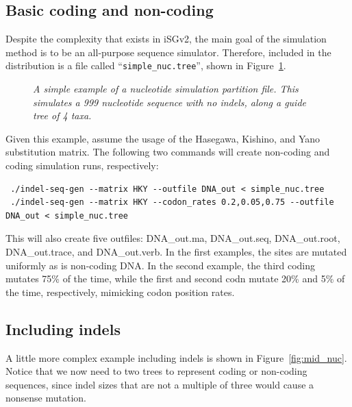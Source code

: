\documentclass[10pt]{article}
\begin{document}
 \subsection{Basic coding and non-coding}
 Despite the complexity that exists in iSGv2, the main goal of the simulation method is to be an all-purpose sequence simulator. Therefore, included in the distribution is a file called ``{\tt simple\_nuc.tree}'', shown in Figure~\ref{fig:simple_nuc}.

 \begin{figure}
 \caption{\textit{A simple example of a nucleotide simulation partition file. This simulates a 999 nucleotide sequence with no indels, along a guide tree of 4 taxa.}}
 \label{fig:simple_nuc}
 \end{figure}

 Given this example, assume the usage of the Hasegawa, Kishino, and Yano~\cite{Hasegawa85} substitution matrix. The following two commands will create non-coding and coding simulation runs, respectively:
 \begin{verbatim}
 ./indel-seq-gen --matrix HKY --outfile DNA_out < simple_nuc.tree
 ./indel-seq-gen --matrix HKY --codon_rates 0.2,0.05,0.75 --outfile DNA_out < simple_nuc.tree
 \end{verbatim}

 This will also create five outfiles: DNA\_out.ma, DNA\_out.seq, DNA\_out.root, DNA\_out.trace, and DNA\_out.verb. In the first examples, the sites are mutated uniformly as is non-coding DNA. In the second example, the third coding mutates 75\% of the time, while the first and second codn mutate 20\% and 5\% of the time, respectively, mimicking codon position rates.

 \subsection{Including indels}

 A little more complex example including indels is shown in Figure~\ref{fig:mid_nuc}. Notice that we now need to two trees to represent coding or non-coding sequences, since indel sizes that are not a multiple of three would cause a nonsense mutation.
\end{document}
